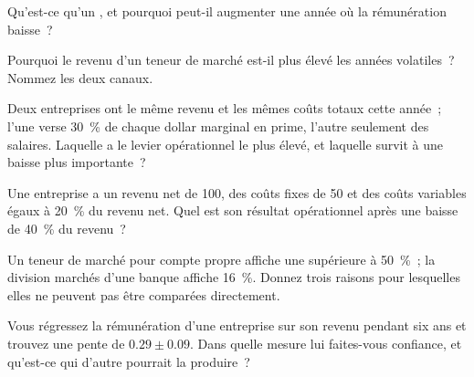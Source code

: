 \begin{interviewq}\label{iq:fm:the-economics-of-a-trading-firm:1}
Qu'est-ce qu'un , et pourquoi peut-il augmenter une année où la rémunération baisse~?
\end{interviewq}

\begin{interviewq}\label{iq:fm:the-economics-of-a-trading-firm:2}
Pourquoi le revenu d'un teneur de marché est-il plus élevé les années volatiles~? Nommez les deux canaux.
\end{interviewq}

\begin{interviewq}\label{iq:fm:the-economics-of-a-trading-firm:3}
Deux entreprises ont le même revenu et les mêmes coûts totaux cette année~; l'une verse 30~\% de chaque dollar marginal en prime, l'autre seulement des salaires. Laquelle
a le levier opérationnel le plus élevé, et laquelle survit à une baisse plus importante~?
\end{interviewq}

\begin{interviewq}\label{iq:fm:the-economics-of-a-trading-firm:4}
Une entreprise a un revenu net de 100, des coûts fixes de 50 et des coûts variables égaux à 20~\% du revenu net. Quel est son résultat opérationnel après une baisse de 40~\% du
revenu~?
\end{interviewq}

\begin{interviewq}\label{iq:fm:the-economics-of-a-trading-firm:5}
Un teneur de marché pour compte propre affiche une  supérieure à 50~\%~; la division marchés d'une banque affiche 16~\%. Donnez trois raisons pour lesquelles elles
ne peuvent pas être comparées directement.
\end{interviewq}

\begin{interviewq}\label{iq:fm:the-economics-of-a-trading-firm:6}
Vous régressez la rémunération d'une entreprise sur son revenu pendant six ans et trouvez une pente de $0.29\pm0.09$. Dans quelle mesure lui faites-vous confiance, et qu'est-ce qui d'autre pourrait la produire~?
\end{interviewq}
